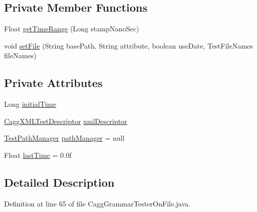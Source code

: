 \subsection*{Private Member Functions}
\begin{DoxyCompactItemize}
\item 
Float \hyperlink{classit_1_1emarolab_1_1cagg_1_1interfaces_1_1CaggGrammarTesterOnFile_a619b3e1cbf412eb168b0fc0f4fa1f950}{get\-Time\-Range} (Long stamp\-Nano\-Sec)
\item 
void \hyperlink{classit_1_1emarolab_1_1cagg_1_1interfaces_1_1CaggGrammarTesterOnFile_a3401ec2f15bb57b17971c7b0aa9bd6b0}{set\-File} (String base\-Path, String attribute, boolean use\-Date, Test\-File\-Names file\-Names)
\end{DoxyCompactItemize}
\subsection*{Private Attributes}
\begin{DoxyCompactItemize}
\item 
Long \hyperlink{classit_1_1emarolab_1_1cagg_1_1interfaces_1_1CaggGrammarTesterOnFile_aa7fa89b5e8c79da8dc430363895eef6b}{initial\-Time}
\item 
\hyperlink{classit_1_1emarolab_1_1cagg_1_1debugging_1_1result2XML_1_1CaggXMLTestDescriptor}{Cagg\-X\-M\-L\-Test\-Descriptor} \hyperlink{classit_1_1emarolab_1_1cagg_1_1interfaces_1_1CaggGrammarTesterOnFile_ae37c531553e39bd42b44cda4dd95cb05}{xml\-Descriptor}
\item 
\hyperlink{classit_1_1emarolab_1_1cagg_1_1interfaces_1_1CaggGrammarTesterOnFile_1_1TestPathManager}{Test\-Path\-Manager} \hyperlink{classit_1_1emarolab_1_1cagg_1_1interfaces_1_1CaggGrammarTesterOnFile_a9ec5e0710fd9124f63294f5596d38a3e}{path\-Manager} = null
\item 
Float \hyperlink{classit_1_1emarolab_1_1cagg_1_1interfaces_1_1CaggGrammarTesterOnFile_a4213d4b2622ad45ea32fe421d21f2cb4}{last\-Time} = 0.\-0f
\end{DoxyCompactItemize}


\subsection{Detailed Description}


Definition at line 65 of file Cagg\-Grammar\-Tester\-On\-File.\-java.



